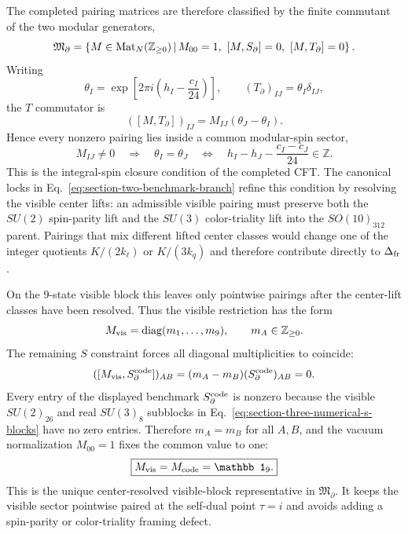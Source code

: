 \documentclass[11pt]{article}
\DeclareMathOperator{\diag}{diag}
\newcommand{\kell}{k_{\ell}}
\newcommand{\kq}{k_q}
\newcommand{\Kpar}{K}
\newcommand{\Deltafr}{\Delta_{\rm fr}}
\begin{document}
The completed pairing matrices are therefore classified by the finite
commutant of the two modular generators,
\begin{equation}
\label{eq:section-three-pairing-classification-set}
 \mathfrak M_{\partial}
 =
 \left\{
 M\in{\rm Mat}_{N}(\mathbb Z_{\ge0})
 \,\middle|\,
 M_{00}=1,\ [M,S_{\partial}]=0,\ [M,T_{\partial}]=0
 \right\}.
\end{equation}
Writing
\begin{equation}
\label{eq:section-three-t-phase}
 \theta_I
 =
 \exp\!\left[2\pi i\left(h_I-\frac{c_I}{24}\right)\right],
 \qquad
 (T_{\partial})_{IJ}=\theta_I\delta_{IJ},
\end{equation}
the $T$ commutator is
\begin{equation}
\label{eq:section-three-t-commutator-entry}
 ([M,T_{\partial}])_{IJ}
 =
 M_{IJ}(\theta_J-\theta_I).
\end{equation}
Hence every nonzero pairing lies inside a common modular-spin sector,
\begin{equation}
\label{eq:section-three-integral-spin-closure}
 M_{IJ}\ne0
 \quad\Longrightarrow\quad
 \theta_I=\theta_J
 \quad\Longleftrightarrow\quad
 h_I-h_J-\frac{c_I-c_J}{24}\in\mathbb Z.
\end{equation}
This is the integral-spin closure condition of the completed CFT.  The
canonical locks in Eq.~\eqref{eq:section-two-benchmark-branch} refine this
condition by resolving the visible center lifts: an admissible visible pairing
must preserve both the $SU(2)$ spin-parity lift and the $SU(3)$ color-triality
lift into the $SO(10)_{312}$ parent.  Pairings that mix different lifted center
classes would change one of the integer quotients
$\Kpar/(2\kell)$ or $\Kpar/(3\kq)$ and therefore contribute directly to
$\Deltafr$.

On the $9$-state visible block this leaves only pointwise pairings after the
center-lift classes have been resolved.  Thus the visible restriction has the
form
\begin{equation}
\label{eq:section-three-visible-diagonal-class}
 M_{\rm vis}
 =
 \diag(m_1,\ldots,m_9),
 \qquad
 m_A\in\mathbb Z_{\ge0}.
\end{equation}
The remaining $S$ constraint forces all diagonal multiplicities to coincide:
\begin{equation}
\label{eq:section-three-visible-s-diagonal-constraint}
 ([M_{\rm vis},S_{\partial}^{\rm code}])_{AB}
 =
 (m_A-m_B)(S_{\partial}^{\rm code})_{AB}=0.
\end{equation}
Every entry of the displayed benchmark $S_{\partial}^{\rm code}$ is nonzero
because the visible $SU(2)_{26}$ and real $SU(3)_8$ subblocks in
Eq.~\eqref{eq:section-three-numerical-s-blocks} have no zero entries.
Therefore $m_A=m_B$ for all $A,B$, and the vacuum normalization $M_{00}=1$
fixes the common value to one:
\begin{equation}
\label{eq:section-three-visible-identity-unique}
 \boxed{
 M_{\rm vis}=M_{\rm code}=\mathbb 1_9.}
\end{equation}
This is the unique center-resolved visible-block representative in
\(\mathfrak M_{\partial}\).  It keeps the visible sector pointwise paired at
the self-dual point $\tau=i$ and avoids adding a spin-parity or color-triality
framing defect.
\end{document}
